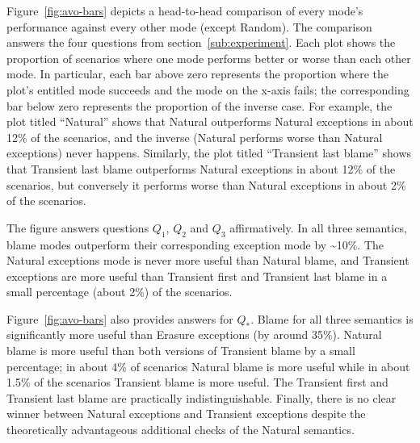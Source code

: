 Figure~\ref{fig:avo-bars} depicts a head-to-head comparison of every
mode's performance against every other mode (except Random). The
comparison  answers the four questions from section~\ref{sub:experiment}. 
Each plot shows the proportion of scenarios where one mode performs
better or worse than each other mode.  In particular, each bar above zero
represents the proportion where the plot's entitled mode succeeds and the
mode on the x-axis fails; the corresponding bar below zero represents the
proportion of the inverse case.  For example, the plot titled ``Natural''
shows that Natural outperforms Natural exceptions in about 12\% of the
scenarios, and the inverse (Natural performs worse than Natural
exceptions) never happens.  Similarly, the plot titled ``Transient last
blame'' shows that Transient last blame outperforms Natural exceptions
 in about 12\% of the scenarios, but conversely it performs worse
than Natural exceptions in about 2\% of the scenarios.

The figure answers questions $Q_1$, $Q_2$ and $Q_3$ affirmatively.  
In all three semantics, blame modes outperform their
corresponding exception mode by \textasciitilde10\%.  The
Natural exceptions mode is never more useful than Natural blame, and
Transient exceptions are more useful than Transient first and Transient
last blame in a small percentage (about 2\%) of the scenarios. 

Figure~\ref{fig:avo-bars} also provides answers for $Q_*$.
Blame for all three semantics is significantly
more useful than Erasure exceptions (by around 35\%). Natural blame is
more useful than both versions of Transient blame by a small percentage;
in about 4\% of scenarios Natural blame is more useful while in about 1.5\% of the
scenarios Transient blame is more useful. The Transient first and
Transient last blame are practically indistinguishable. Finally, there is
no clear winner between Natural exceptions and Transient exceptions
despite the theoretically advantageous additional checks of the Natural
semantics.

